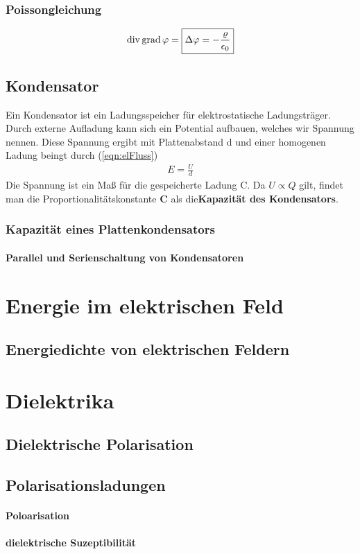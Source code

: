 \subsubsection{Poissongleichung}\begin{align}\label{eqn:Poissongleichung}
\mathrm{div\,} \mathrm{grad\,} \varphi = \boxed{\Delta \varphi = -\frac{\varrho}{\epsilon_0}}
\end{align}
\subsection{Kondensator}Ein Kondensator ist ein Ladungsspeicher für elektrostatische Ladungsträger. Durch externe Aufladung kann sich ein Potential aufbauen, welches wir Spannung nennen. Diese Spannung ergibt mit  Plattenabstand d und einer homogenen Ladung beingt durch (\ref{eqn:elFluss})\begin{align}
E = \frac{U}{d}
\end{align}Die Spannung ist ein Maß für die gespeicherte Ladung C. Da $U \propto Q$ gilt, findet man die Proportionalitätskonstante \textbf{C} als die\textbf{Kapazität des Kondensators}.
\subsubsection{Kapazität eines Plattenkondensators}
\paragraph{Parallel und Serienschaltung von Kondensatoren}
\section{Energie im elektrischen Feld}
\subsection{Energiedichte von elektrischen Feldern}


\section{Dielektrika}
\subsection{Dielektrische Polarisation}
\subsection{Polarisationsladungen}
 \paragraph{Poloarisation}
 \paragraph{dielektrische Suzeptibilität}
 